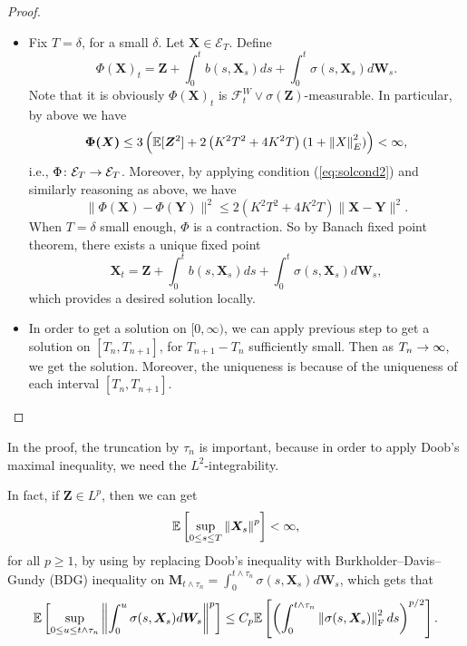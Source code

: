 \begin{proof}
\begin{itemize}
        \item Fix $T = \delta$, for a small $\delta$. Let $\bm{X} \in \mathcal{E}_T$. Define
        \begin{equation*}
            \Phi(\bm{X})_t = \bm{Z} + \int_0^tb(s,\bm{X}_s)ds + \int_0^t \sigma(s,\bm{X}_s)d\bm{W}_s.
        \end{equation*}
        Note that it is obviously $\Phi(\bm{X})_t$ is $\mathcal{F}^W_t \vee \sigma(\bm{Z})$-measurable. In particular, by above we have
        \begin{equation*}
            \bm{\Phi(X)} \leq 3\left(\mathbb{E}[\bm{Z}^2] + 2\left(K^2 T^2+4 K^2T\right)(1 + \left\lVert X\right\lVert_E^2)\right) < \infty,
        \end{equation*}
        i.e., $\Phi \colon \mathcal{E}_T \rightarrow \mathcal{E}_T$. Moreover, by applying condition (\ref{eq:solcond2}) and similarly reasoning as above, we have
        \begin{equation*}
            \|\Phi(\bm{X})-\Phi(\bm{Y})\|^2 \leq 2\left(K^2 T^2+4 K^2 T\right)\|\bm{X}-\bm{Y}\|^2.
        \end{equation*}
        When $T = \delta$ small enough, $\Phi$ is a contraction. So by Banach fixed point theorem, there exists a unique fixed point
        \begin{equation*}
            \bm{X}_t = \bm{Z} + \int_0^tb(s,\bm{X}_s)ds + \int_0^t \sigma(s,\bm{X}_s)d\bm{W}_s,
        \end{equation*}
        which provides a desired solution locally.

       \item In order to get a solution on $[0,\infty)$, we can apply previous step to get a solution on $[T_n,T_{n+1}]$, for $T_{n+1} - T_n$ sufficiently small. Then as $T_n \rightarrow \infty$, we get the solution. Moreover, the uniqueness is because of the uniqueness of each interval $[T_n,T_{n+1}]$. \qedhere
    \end{itemize}
\end{proof}
\begin{rmk}
    In the proof, the truncation by $\tau_n$ is important, because in order to apply Doob's maximal inequality, we need the $L^2$-integrability. 
\end{rmk}
\begin{rmk}
    In fact, if $\bm{Z} \in L^p$, then we can get
    \begin{equation*}
        \mathbb{E}\left[\sup_{0 \leq s \leq T}\left\lVert\bm{X}_s\right\lVert^p\right] <\infty,
    \end{equation*}
    for all $p \geq 1$, by using by replacing Doob's inequality with Burkholder–Davis–Gundy (BDG) inequality on $\bm{M}_{t \wedge \tau_n} = \int_0^{t \wedge \tau_n} \sigma(s,\bm{X}_s)d\bm{W}_s$, which gets that
    \begin{equation*}
        \mathbb{E}\left[\sup_{0 \leq u \leq t \wedge \tau_n} \left\lVert\int_0^{u} \sigma(s,\bm{X}_s)d\bm{W}_s\right\lVert^p\right] \leq C_p\mathbb{E}\left[\left(\int_0^{t  \wedge \tau_n} \left\lVert\sigma(s,\bm{X}_s)\right\lVert_{\operatorname{F}}^2 ds\right)^{p/2}\right].
    \end{equation*}
\end{rmk}

